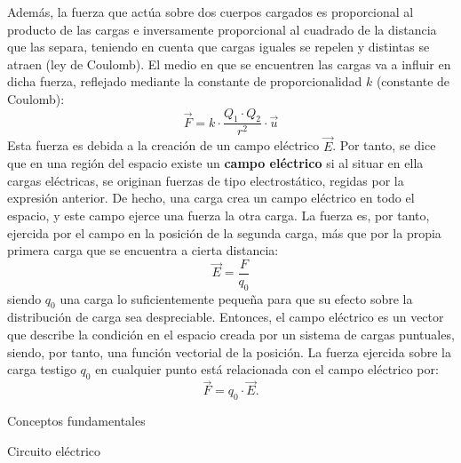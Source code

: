 \documentclass[11pt]{book} %
\makeatletter
\numberwithin{dummy}{section}
\theoremstyle{ocrenumbox}
\theoremstyle{blacknumex}
\theoremstyle{blacknumbox}
\theoremstyle{ocrenum}
\renewcommand{\section}{\@startsection{section}{1}{\z@}
{-4ex \@plus -1ex \@minus -.4ex}
{1ex \@plus.2ex }
{\normalfont\large\sffamily\bfseries}}
\renewcommand{\subsection}{\@startsection {subsection}{2}{\z@}
{-3ex \@plus -0.1ex \@minus -.4ex}
{0.5ex \@plus.2ex }
{\normalfont\sffamily\bfseries}}
\newlength\esp
\makeatother
\begin{document}
	Además, la fuerza que actúa sobre dos cuerpos cargados es proporcional al producto de las cargas e inversamente proporcional al cuadrado de la distancia que las separa, teniendo en cuenta que cargas iguales se repelen y distintas se atraen (ley de Coulomb). El medio en que se encuentren las cargas va a influir en dicha fuerza, reflejado mediante la constante de proporcionalidad $k$ (constante de Coulomb):
	\begin{equation*}\label{eq.coulomb}
		\Vec{F}=k\cdot\dfrac{Q_1\cdot Q_2}{r^2}\cdot \Vec{u}
	\end{equation*}
	Esta fuerza es debida a la creación de un campo eléctrico $\Vec{E}$. Por tanto, se dice que en una región del espacio existe un \textbf{campo eléctrico} si al situar en ella cargas eléctricas, se originan fuerzas de tipo electrostático, regidas por la expresión anterior. De hecho, una carga crea un campo eléctrico en todo el espacio, y este campo ejerce una fuerza la otra carga. La fuerza es, por tanto, ejercida por el campo en la posición de la segunda carga, más que por la propia primera carga que se encuentra a cierta distancia:
	\begin{equation*}
		\Vec{E}=\dfrac{F}{q_0}
	\end{equation*}
	siendo $q_0$ una carga lo suficientemente pequeña para que su efecto sobre la distribución de carga sea despreciable. Entonces, el campo eléctrico es un vector que describe la condición en el espacio creada por un sistema de cargas puntuales, siendo, por tanto, una función vectorial de la posición. La fuerza ejercida sobre la carga testigo $q_0$ en cualquier punto está relacionada con el campo eléctrico por:
	\begin{equation*}
		\Vec{F}=q_0\cdot \Vec{E}.
	\end{equation*}
	
	
	\section{Conceptos fundamentales}
	
	\subsection{Circuito eléctrico} \label{sec.circuito_electrico}
	
\end{document}
